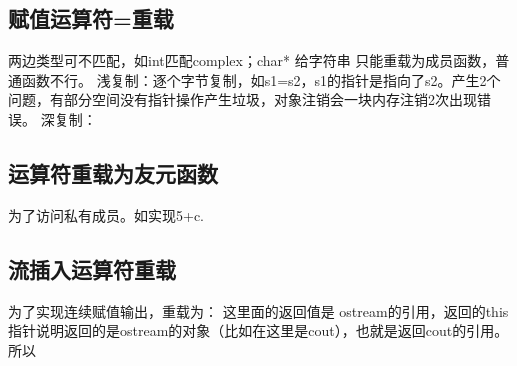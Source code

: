 \documentclass[UTF8]{article}
\begin{document}
\subsection{赋值运算符=重载}
两边类型可不匹配，如int匹配complex；char* 给字符串
只能重载为成员函数，普通函数不行。
浅复制：逐个字节复制，如s1=s2，s1的指针是指向了s2。产生2个问题，有部分空间没有指针操作产生垃圾，对象注销会一块内存注销2次出现错误。
深复制：

\subsection{运算符重载为友元函数}
为了访问私有成员。如实现5+c.

\subsection{流插入运算符重载}
为了实现连续赋值输出，重载为：
这里面的返回值是 ostream的引用，返回的this指针说明返回的是ostream的对象（比如在这里是cout），也就是返回cout的引用。
所以
\begin{comment}

\end{comment}
\end{document}
